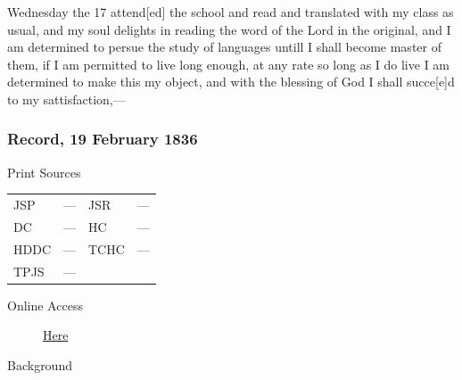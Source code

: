 					Wednesday the 17 attend[ed] the school and read and translated with my class as usual, and my soul delights in reading the word of the Lord in the original, and I am determined to persue the study of languages untill I shall become master of them, if I am permitted to live long enough, at any rate so long as I do live I am determined to make this my object, and with the blessing of God I shall succe[e]d to my sattisfaction,---
					
		\subsubsection{Record, 19 February 1836}
			\label{EMS-1836-JS-19-FEB-1836}
			
			\begin{description}
					\item[Print Sources]
				\end{description}

					\begin{tabular}{p{0.5in}p{1in}p{0.5in}p{1in}}
					JSP	 	& ---		& JSR 		& --- \\
					DC	 	& ---		& HC 		& --- \\
					HDDC 	& ---		& TCHC 		& --- \\
					TPJS 	& ---		& 	 		&  \\
					\end{tabular}
				
				\begin{description}
					\item[Online Access] \href{https://www.josephsmithpapers.org/paper-summary/journal-1835-1836/159}{Here}
				\end{description}
				
				\begin{description}
					\item[Background]
				\end{description}
				
				
